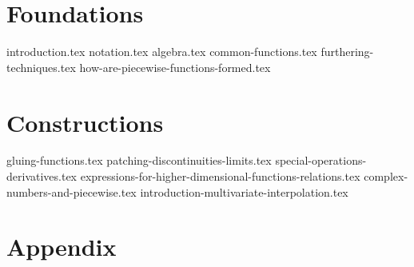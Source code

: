 \documentclass[10pt,a4paper]{article}
\begin{document}
\maketitle
\tableofcontents
\newpage

\part{Foundations}
{introduction.tex}
{notation.tex}
{algebra.tex}
{common-functions.tex}
{furthering-techniques.tex}
{how-are-piecewise-functions-formed.tex}

\part{Constructions}
{gluing-functions.tex}
{patching-discontinuities-limits.tex}
{special-operations-derivatives.tex}
{expressions-for-higher-dimensional-functions-relations.tex}
{complex-numbers-and-piecewise.tex}
{introduction-multivariate-interpolation.tex}

\part{Appendix}
\printglossary[title=Glossary, toctitle=Glossary]
\glsaddallunused
\end{document}
